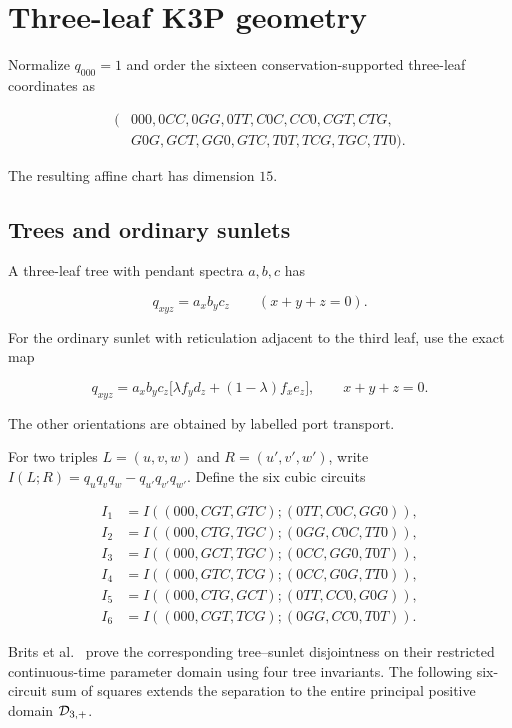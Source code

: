 \section{Three-leaf K3P geometry}\label{sec:three-leaf}

Normalize \(q_{000}=1\) and order the sixteen conservation-supported
three-leaf coordinates as

\begin{equation}\label{eq:three-order}
\begin{split}
(&000,0CC,0GG,0TT,C0C,CC0,CGT,CTG,\\
 &G0G,GCT,GG0,GTC,T0T,TCG,TGC,TT0).
\end{split}
\end{equation}

The resulting affine chart has dimension \(15\).

\subsection{Trees and ordinary sunlets}

A three-leaf tree with pendant spectra \(a,b,c\) has

\[
 q_{xyz}=a_xb_yc_z\qquad(x+y+z=0).
\]

For the ordinary sunlet with reticulation adjacent to the third leaf, use
the exact map

\begin{equation}\label{eq:sunlet-map}
 q_{xyz}=a_xb_yc_z
 \bigl[\lambda f_y d_z+(1-\lambda)f_xe_z\bigr],
 \qquad x+y+z=0.
\end{equation}

The other orientations are obtained by labelled port transport.

For two triples \(L=(u,v,w)\) and \(R=(u',v',w')\), write
\(I(L;R)=q_uq_vq_w-q_{u'}q_{v'}q_{w'}\).  Define the six cubic circuits

\begin{align*}
I_1&=I((000,CGT,GTC);(0TT,C0C,GG0)),\\
I_2&=I((000,CTG,TGC);(0GG,C0C,TT0)),\\
I_3&=I((000,GCT,TGC);(0CC,GG0,T0T)),\\
I_4&=I((000,GTC,TCG);(0CC,G0G,TT0)),\\
I_5&=I((000,CTG,GCT);(0TT,CC0,G0G)),\\
I_6&=I((000,CGT,TCG);(0GG,CC0,T0T)).
\end{align*}

Brits et al.~\cite[Lemma~4.2]{BritsEtAl2026} prove the corresponding
tree--sunlet disjointness on their restricted continuous-time parameter
domain using four tree invariants.  The following six-circuit sum of squares
extends the separation to the entire principal positive domain \(\mathcal D_{3,+}\).

